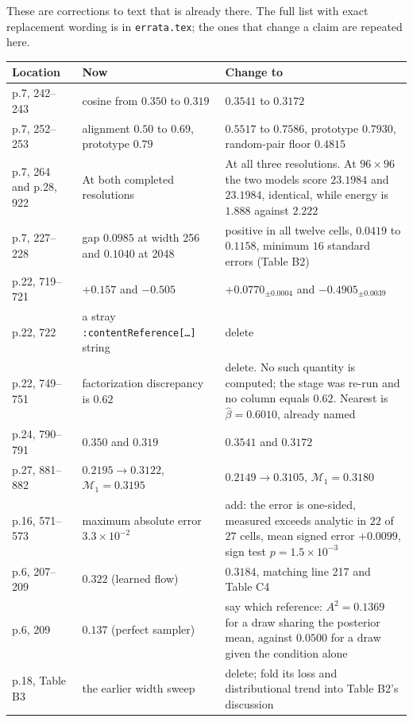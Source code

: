 \documentclass[11pt]{article}
\newcommand{\M}{\mathcal M}
\begin{document}
These are corrections to text that is already there. The full list with exact replacement wording
is in \texttt{errata.tex}; the ones that change a claim are repeated here.

\begin{longtable}{@{}p{}p{}p{}@{}}
\toprule
Location & Now & Change to\\
\midrule
\endhead
p.7, 242--243 & cosine from $0.350$ to $0.319$ & $0.3541$ to $0.3172$\\
p.7, 252--253 & alignment $0.50$ to $0.69$, prototype $0.79$ & $0.5517$ to $0.7586$, prototype
$0.7930$, random-pair floor $0.4815$\\
p.7, 264 and p.28, 922 & At both completed resolutions & At all three resolutions. At
$96\times96$ the two models score $23.1984$ and $23.1984$, identical, while energy is $1.888$
against $2.222$\\
p.7, 227--228 & gap $0.0985$ at width 256 and $0.1040$ at 2048 & positive in all twelve cells,
$0.0419$ to $0.1158$, minimum $16$ standard errors (Table B2)\\
p.22, 719--721 & $+0.157$ and $-0.505$ & $+0.0770_{\pm0.0004}$ and $-0.4905_{\pm0.0039}$\\
p.22, 722 & a stray \texttt{:contentReference[\ldots]} string & delete\\
p.22, 749--751 & factorization discrepancy is $0.62$ & delete. No such quantity is computed; the
stage was re-run and no column equals $0.62$. Nearest is $\hat\beta=0.6010$, already named\\
p.24, 790--791 & $0.350$ and $0.319$ & $0.3541$ and $0.3172$\\
p.27, 881--882 & $0.2195\to0.3122$, $\M_1=0.3195$ & $0.2149\to0.3105$, $\M_1=0.3180$\\
p.16, 571--573 & maximum absolute error $3.3\times10^{-2}$ & add: the error is one-sided,
measured exceeds analytic in $22$ of $27$ cells, mean signed error $+0.0099$, sign test
$p=1.5\times10^{-3}$\\
p.6, 207--209 & $0.322$ (learned flow) & $0.3184$, matching line 217 and Table C4\\
p.6, 209 & $0.137$ (perfect sampler) & say which reference: $A^2=0.1369$ for a draw sharing the
posterior mean, against $0.0500$ for a draw given the condition alone\\
p.18, Table B3 & the earlier width sweep & delete; fold its loss and distributional trend into
Table B2's discussion\\
\bottomrule
\end{longtable}
\end{document}
